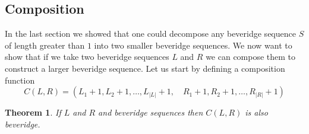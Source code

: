 \documentclass{macjourn}
\newcommand{\cardinality}[1]{\left| #1 \right|}
\newtheorem{theorem}{Theorem}[subsection]
\theoremstyle{definition}
\begin{document}
	
	\subsection{Composition}
	In the last section we showed that one could decompose any beveridge sequence $S$ of length greater than $1$ into two smaller beveridge sequences. We now want to show that if we take two beveridge sequences $L$ and $R$ we can compose them to construct a larger beveridge sequence. Let us start by defining a composition function \[C(L,R) = (L_1 + 1, L_2 + 1, \ldots, L_{\cardinality L} + 1,\quad R_1 + 1, R_2 + 1, \ldots, R_{\cardinality R} + 1)\]
	
	
	\begin{theorem} \label{compose}
		If $L$ and $R$ and beveridge sequences then $C(L,R)$ is also beveridge.
	\end{theorem}
	
\end{document}
